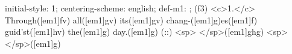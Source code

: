 initial-style: 1;
centering-scheme: english;
def-m1: \grealign;
(f3) <c>1.</c> Through([em1]fv) all([em1]gv) its([em1]gv) chang-([em1]g)es([em1]f) guid'st([em1]hv) the([em1]g) day.([em1]g) (::) <sp> </sp>([em1]ghg) <sp>   </sp>([em1]g)